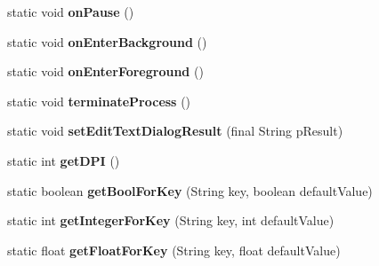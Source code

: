 \begin{DoxyCompactItemize}
\item 
\mbox{\label{classorg_1_1cocos2dx_1_1lib_1_1Cocos2dxHelper_a559d7d5b9b90ad3f40c3950483ccfa55}} 
static void {\bfseries on\+Pause} ()
\item 
\mbox{\label{classorg_1_1cocos2dx_1_1lib_1_1Cocos2dxHelper_a0ff2233d242ce6597fb56c76fc918e89}} 
static void {\bfseries on\+Enter\+Background} ()
\item 
\mbox{\label{classorg_1_1cocos2dx_1_1lib_1_1Cocos2dxHelper_af700ec73f9fa27f1f7eb91bf211dff94}} 
static void {\bfseries on\+Enter\+Foreground} ()
\item 
\mbox{\label{classorg_1_1cocos2dx_1_1lib_1_1Cocos2dxHelper_ad2eb1bd09d78e738c66e0ebbba226eb7}} 
static void {\bfseries terminate\+Process} ()
\item 
\mbox{\label{classorg_1_1cocos2dx_1_1lib_1_1Cocos2dxHelper_a994f8e6d3591a25e512cea37cf4910a7}} 
static void {\bfseries set\+Edit\+Text\+Dialog\+Result} (final String p\+Result)
\item 
\mbox{\label{classorg_1_1cocos2dx_1_1lib_1_1Cocos2dxHelper_a0a5575e4ad31c1707bd1cd285d69663e}} 
static int {\bfseries get\+D\+PI} ()
\item 
\mbox{\label{classorg_1_1cocos2dx_1_1lib_1_1Cocos2dxHelper_a3b4f91194080d8daa0b3aa31be3f371a}} 
static boolean {\bfseries get\+Bool\+For\+Key} (String key, boolean default\+Value)
\item 
\mbox{\label{classorg_1_1cocos2dx_1_1lib_1_1Cocos2dxHelper_a6bfcd60c4c80ec872579b0ec801f7c52}} 
static int {\bfseries get\+Integer\+For\+Key} (String key, int default\+Value)
\item 
\mbox{\label{classorg_1_1cocos2dx_1_1lib_1_1Cocos2dxHelper_ac42bbe5c37568e0f49a7a2d855ccb1a4}} 
static float {\bfseries get\+Float\+For\+Key} (String key, float default\+Value)

\end{DoxyCompactItemize}
